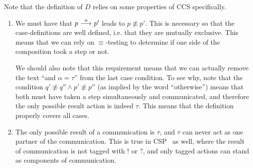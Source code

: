 Note that the definition of $D$ relies on some properties of CCS specifically.
\begin{enumerate}
    \item We must have that $p \ {\stackrel{{a}}{\longrightarrow}}\  p'$ leads to $p\not\equiv p'$. This is
          necessary so that the case-definitions are well defined, i.e. that
          they are mutually exclusive. This means that we can rely on
          $\equiv$-testing to determine if one side of the composition took
          a step or not.

          We should also note that this requirement means that we can actually
          remove the text ``and $\alpha=\tau$'' from the last case condition. To
          see why, note that the condition $q'\not\equiv q'' \land p'\not\equiv p''$
          (as implied by the word ``otherwise'') means that both must have taken
          a step simultaneously and communicated,  and therefore the only possible
          result action is indeed $\tau$. This means that the definition properly
          covers all cases.
    \item The only possible result of a communication is $\tau$, and $\tau$
          can never act as one partner of the communication. This is true in CSP~\cite{Hoare85}
          as well, where the result of communication is not tagged with $!$ or
          $?$, and only tagged actions can stand as components of communication.
\end{enumerate}


